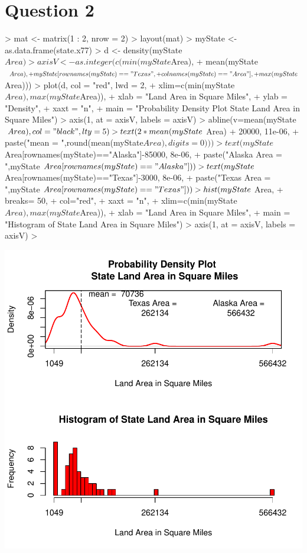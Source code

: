 \documentclass{article}
\begin{document}
\section*{Question 2}
\begin{Schunk}
\begin{Sinput}
> mat <- matrix(1 : 2, nrow = 2)
> layout(mat)
> myState <- as.data.frame(state.x77)
> d <- density(myState$Area)
> axisV <- as.integer(c(min(myState$Area),
+                       mean(myState$Area),
+                       myState[rownames(myState)== "Texas",
+                               colnames(myState)=="Area"],
+                       max(myState$Area))) 
> plot(d, col = "red", lwd = 2,
+     xlim=c(min(myState$Area),max(myState$Area)),
+     xlab = "Land Area in Square Miles",
+     ylab = "Density",
+     xaxt = "n",
+     main = "Probability Density Plot \n State Land Area in Square Miles")
> axis(1, at = axisV, labels = axisV) 
> abline(v=mean(myState$Area),col = "black", lty = 5) 
> text(2 * mean(myState$Area) + 20000, 11e-06,
+      paste("mean = ",round(mean(myState$Area), digits=0)))
> text(myState$Area[rownames(myState)=="Alaska"]-85000, 8e-06,
+      paste("Alaska Area = \n",myState$Area[rownames(myState)=="Alaska"])) 
> text(myState$Area[rownames(myState)=="Texas"]-3000, 8e-06,
+      paste("Texas Area = \n",myState$Area[rownames(myState)=="Texas"]))
> hist(myState$Area, 
+      breaks= 50, 
+      col="red",
+      xaxt = "n",
+      xlim=c(min(myState$Area),max(myState$Area)),
+      xlab = "Land Area in Square Miles",
+      main = "Histogram of State Land Area in Square Miles")
> axis(1, at = axisV, labels = axisV) 
> 
\end{Sinput}
\end{Schunk}
\includegraphics{Homework2-002}
\end{document}
